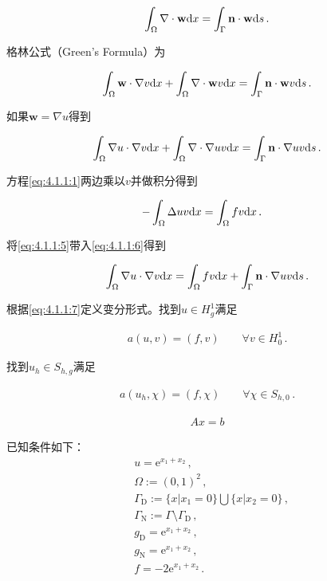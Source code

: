 \begin{align}\label{eq:4.1.1:3}
  \int_{\Omega}\nabla \cdot \mathbf w \mathrm{d} x = \int_{\Gamma}\mathbf n \cdot \mathbf w \mathrm{d} s\,.
\end{align}

格林公式（Green's Formula）为

\begin{align}\label{eq:4.1.1:4}
  \int_{\Omega}\mathbf w \cdot \nabla v  \mathrm{d} x  + \int_{\Omega}\nabla\cdot\mathbf w  v  \mathrm{d} x = \int_{\Gamma}\mathbf n \cdot \mathbf w v\mathrm{d} s \,.
\end{align}

如果$\mathbf w=\nabla u$得到

\begin{align}\label{eq:4.1.1:5}
  \int_{\Omega}\nabla u \cdot \nabla v  \mathrm{d} x  + \int_{\Omega}\nabla\cdot\nabla u  v  \mathrm{d} x = \int_{\Gamma}\mathbf n \cdot \nabla u v\mathrm{d} s \,.
\end{align}

方程\eqref{eq:4.1.1:1}两边乘以$v$并做积分得到

\begin{align}\label{eq:4.1.1:6}
  -\int_{\Omega}\Delta uv\mathrm{d} x &= \int_{\Omega}fv\mathrm{d} x\,.
\end{align}

将\eqref{eq:4.1.1:5}带入\eqref{eq:4.1.1:6}得到
   
\begin{align}\label{eq:4.1.1:7}
  \int_{\Omega}\nabla u \cdot \nabla v  \mathrm{d} x = \int_{\Omega}fv\mathrm{d} x + \int_{\Gamma}\mathbf n \cdot \nabla u v\mathrm{d} s\,.
\end{align}

根据\eqref{eq:4.1.1:7}定义变分形式。找到$u\in H^1_g$满足

\begin{align}   
  a(u,v)=(f,v) \qquad \forall v\in H^1_0\,.
\end{align}

找到$u_h\in S_{h,g}$满足

\begin{align}   
  a(u_h,\chi)=(f,\chi) \qquad \forall \chi\in S_{h,0}\,.
\end{align}

\begin{align}   
  Ax = b
\end{align}

已知条件如下：
\begin{subequations}
  \begin{align*}
   &u=\mathrm e^{x_1+x_2}\,,\\
   &\Omega:=(0,1)^2\,,\\
   &\Gamma_{\mathrm D}:=\{x|x_1=0\}\bigcup\{x|x_2=0\}\,,\\
   &\Gamma_{\mathrm N}:=\Gamma\setminus\Gamma_{\mathrm D}\,, \\
   &g_{\mathrm D}=\mathrm e^{x_1+x_2}\,,\\
   &g_{\mathrm N}=\mathrm e^{x_1+x_2}\,,\\
    &f=-2\mathrm e^{x_1+x_2}\,.
  \end{align*}
\end{subequations}

